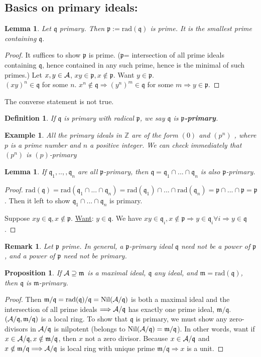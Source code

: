 \documentclass[11pt]{article}
\newtheorem{prop}[thm]{Proposition}
\newtheorem{lemma}[thm]{Lemma}
\newtheorem{dfn}[thm]{Definition}
\newtheorem{rmk}[thm]{Remark}
\newtheorem{ex}[thm]{Example}
\newcommand{\intg}{\mathbb Z}
\newcommand{\scm}{{\mathfrak m}}
\newcommand{\scp}{{\mathfrak p}}
\newcommand{\scq}{\mathfrak q}
\newcommand{\cala}{{\cal A}}
\newcommand{\Lrta}{\Longrightarrow}
\begin{document}
\subsection*{Basics on primary ideals:}
\begin{lemma}
Let $\scq$ primary. Then $\scp:=\text{rad}(\scq)$ is prime. It is the smallest prime containing $\scq.$
\end{lemma}
\begin{proof}
It suffices to show $\scp$ is prime. ($\scp$= intersection of all prime ideals containing $\scq$, hence contained in any such prime, hence is the minimal of such primes.) Let $x,y\in\cala$, $xy\in\scp,x\notin \scp$. Want $y\in\scp$.\\
 $(xy)^n\in\scq$ for some $n$. $x^n\notin\scq\Lrta (y^n)^m\in\scq $ for some $m$$\Lrta  y\in\scp$.
\end{proof}

The converse statement is not true.
\begin{dfn}
If $\scq$ is primary with radical $\scp$, we say $\scq$ is  \textbf{$\scp$-primary}.
\end{dfn}
\begin{ex}
All the primary ideals in $\intg$ are of the form $(0)$ and $(p^n)$ , where $p$ is a prime number and $n$ a positive integer. We can check immediately that $(p^n)$ is $(p)$-primary
\end{ex}
\begin{lemma}
If $\scq_1,..,,\scq_n$ are all $\scp$-primary, then $\scq=\scq_1\cap...\cap \scq_n$ is also $\scp$-primary.
\end{lemma}
\begin{proof}
 $\text{rad}(\scq)=\text{rad}(\scq_1\cap...\cap\scq_n)=\text{rad}(\scq_1)\cap...\cap \text{rad}(\scq_n)=\scp\cap...\cap \scp=\scp$. Then it left to show $\scq_1\cap...\cap\scq_n$ is primary. 

Suppose $xy\in\scq, x\notin \scp$. \underline{Want}: $y\in \scq$. We have $xy\in \scq_i,x\notin\scp\Lrta y\in \scq_i\forall i\Lrta y\in\scq$.
\end{proof}
\begin{rmk}
Let $\scp$ prime. In general, a $\scp$-primary ideal $\scq$ need not be a power of $\scp$, and a power of $\scp$ need not be primary.
\end{rmk}
\begin{prop}\label{lem:rad_maximal_primary}
If $\cala\supseteq\scm$ is a  maximal ideal, $\scq$ any ideal, and $\scm=\text{rad}(\scq)$, then $\scq$ is $\scm$-primary.
\end{prop}
\begin{proof}
Then $\scm/\scq=\text{rad}(\scq)/\scq=\text{Nil}(  \cala/\scq)$ is both a maximal ideal and the intersection of all prime ideals $\Lrta\cala/\scq$ has exactly one prime ideal, $\scm/\scq$. $(\cala/\scq,\scm/\scq)$ is a local ring. To show that $\scq$ is primary, we must show any zero-divisors  in $\cala/\scq$ is nilpotent (belongs to $\text{Nil}(  \cala/\scq)=\scm/\scq$). In other words, want if $x\in\cala/\scq,x\notin\scm/\scq$, then $x$ not a zero divisor. Because $x\in\cala/\scq $ and $ x\notin \scm/\scq\Lrta \cala/\scq $ is local ring with unique prime $\scm/\scq\Lrta x$ is a unit.
\end{proof}
\end{document}
